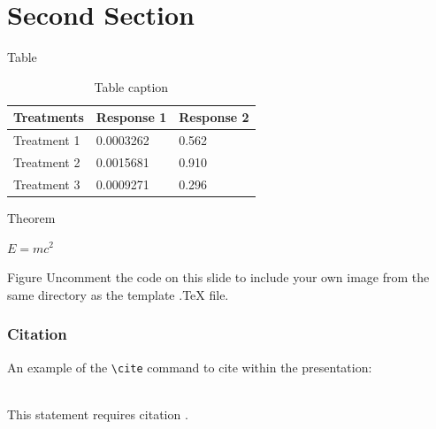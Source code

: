 \documentclass[aspectratio=169,xcolor=dvipsnames,serif]{beamer}
\begin{document}
\section{Second Section}

\begin{frame}{Table}
    \begin{table}
        \begin{tabular}{l l l}
            \toprule
            \textbf{Treatments} & \textbf{Response 1} & \textbf{Response 2} \\
            \midrule
            Treatment 1         & 0.0003262           & 0.562               \\
            Treatment 2         & 0.0015681           & 0.910               \\
            Treatment 3         & 0.0009271           & 0.296               \\
            \bottomrule
        \end{tabular}
        \caption{Table caption}
    \end{table}
\end{frame}


\begin{frame}{Theorem}
    \begin{theorem}
        $E = mc^2$
    \end{theorem}
\end{frame}


\begin{frame}{Figure}
    Uncomment the code on this slide to include your own image from the same directory as the template .TeX file.
\end{frame}


\begin{frame}[fragile] %
    \frametitle{Citation}
    An example of the \verb|\cite| command to cite within the presentation:\\~

    This statement requires citation \cite{p1}.
\end{frame}
\end{document}

